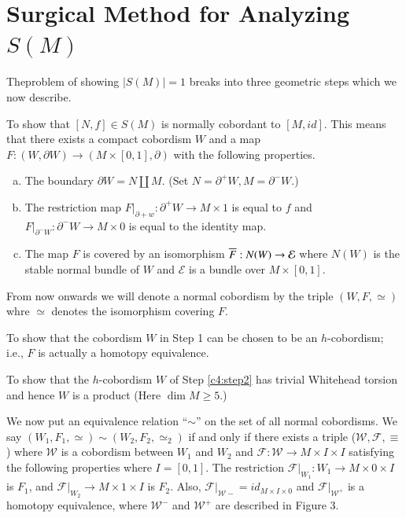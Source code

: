 
\chapter{Surgical Method for Analyzing $S(M)$}\label{c4}

The\pageoriginale problem of showing $|S(M)|=1$ breaks into three geometric steps
which we now describe.

\setcounter{step}{0}
\begin{step}\label{c4:step1}
  To show that $[N,f]\in S(M)$ is normally cobordant to $[M,
    id]$. This means that there exists a compact cobordism $W$ and a
  map $F: (W, \partial W)\to (M \times [0, 1], \partial)$ with the
  following properties.
  \begin{enumerate}[(a)]
    \item The boundary $\partial W = N \coprod M$. (Set $N = \partial
      ^+ W, M= \partial^- W$.)
      \item The restriction map $F|_{\partial +w}: \partial^+ W \to M
        \times 1$ is equal to $f$ and $F|_{\partial^-W} : \partial^- W
        \to M \times 0$ is equal to the identity map.
        \item The map $F$ is covered by an isomorphism $\overline{F}: N (W)
          \to \mathcal{E}$ where $N (W)$ is the stable normal bundle of
          $W$ and $\mathcal{E}$ is a bundle over $M \times [0,1]$.
  \end{enumerate}
  From now onwards we will denote a normal cobordism by the triple
  $(W, F, \simeq)$ whre $\simeq$ denotes the isomorphism covering $F$.
\end{step}

\begin{step}\label{c4:step2}
  To show that the cobordism $W$ in Step 1 can be chosen to be an
  $h$-cobordism; i.e., $F$ is actually a homotopy equivalence.
\end{step}

\begin{step}\label{c4:step3}
  To show that the $h$-cobordism $W$ of Step \ref{c4:step2} has
  trivial Whitehead torsion and hence $W$ is a product (Here $\dim M
  \geq 5$.)
\end{step}

We now put an equivalence relation ``$\sim$'' on the set of all normal
cobordisms. We say $(W_1, F_1, \simeq)\sim (W_2, F_2, \simeq _2)$ if
and only if there exists a triple ($\mathcal{W}, \mathcal{F}, \equiv$)
where $\mathcal{W}$ is a cobordism between $W_1$ and $W_2$ and
$\mathcal{F}: \mathcal{W} \to M \times I \times I$ satisfying the
following properties where $I= [0,1]$. The restriction
$\mathcal{F}|_{W_1}: W_1 \to M \times 0 \times I$ is $F_1$, and
$\mathcal{F}|_{W_2} \to M \times 1 \times I$ is $F_2$. Also,
$\mathcal{F}|_{\mathcal{W}-}= id_{M \times I \times 0}$ and
$\mathcal{F}|_{\mathcal{W}^+}$  is a homotopy equivalence, where
$\mathcal{W}^-$ and $\mathcal{W}^+$ are described in Figure 3.

